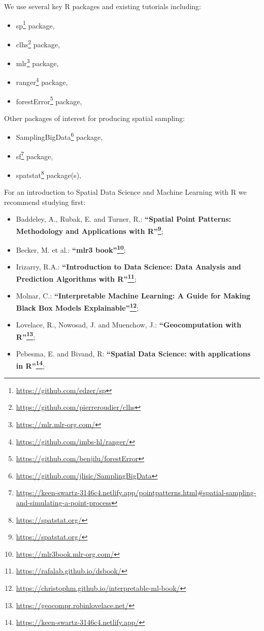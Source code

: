 \documentclass[
  graybox,natbib,nospthms]{svmono}
\providecommand{\tightlist}{%
  \setlength{\itemsep}{0pt}\setlength{\parskip}{0pt}}
\providecommand{\tightlist}{\setlength{\itemsep}{0pt}\setlength{\parskip}{0pt}}
\renewcommand{\href}[2]{#2 (\url{#1})}
\renewcommand{\href}[2]{#2\footnote{\url{#1}}}
\begin{document}
We use several key R packages and existing tutorials including:

\begin{itemize}
\tightlist
\item
  \href{https://github.com/edzer/sp}{sp} package,
\item
  \href{https://github.com/pierreroudier/clhs}{clhs} package,
\item
  \href{https://mlr.mlr-org.com/}{mlr} package,
\item
  \href{https://github.com/imbs-hl/ranger/}{ranger} package,
\item
  \href{https://github.com/benjilu/forestError}{forestError} package,
\end{itemize}

Other packages of interest for producing spatial sampling:

\begin{itemize}
\tightlist
\item
  \href{https://github.com/jlisic/SamplingBigData}{SamplingBigData} package,
\item
  \href{https://keen-swartz-3146c4.netlify.app/pointpatterns.html\#spatial-sampling-and-simulating-a-point-process}{sf} package,
\item
  \href{https://spatstat.org/}{spatstat} package(s),
\end{itemize}

For an introduction to Spatial Data Science and Machine Learning with R we recommend studying first:

\begin{itemize}
\tightlist
\item
  Baddeley, A., Rubak, E. and Turner, R.: \textbf{\href{https://spatstat.org/}{``Spatial Point Patterns: Methodology and Applications with R''}};\\
\item
  Becker, M. et al.: \textbf{\href{https://mlr3book.mlr-org.com/}{``mlr3 book''}};\\
\item
  Irizarry, R.A.: \textbf{\href{https://rafalab.github.io/dsbook/}{``Introduction to Data Science: Data Analysis and Prediction Algorithms with R''}};\\
\item
  Molnar, C.: \textbf{\href{https://christophm.github.io/interpretable-ml-book/}{``Interpretable Machine Learning: A Guide for Making Black Box Models Explainable''}};\\
\item
  Lovelace, R., Nowosad, J. and Muenchow, J.: \textbf{\href{https://geocompr.robinlovelace.net/}{``Geocomputation with R''}};\\
\item
  Pebesma, E. and Bivand, R: \textbf{\href{https://keen-swartz-3146c4.netlify.app/}{``Spatial Data Science: with applications in R''}};
\end{itemize}
\end{document}
